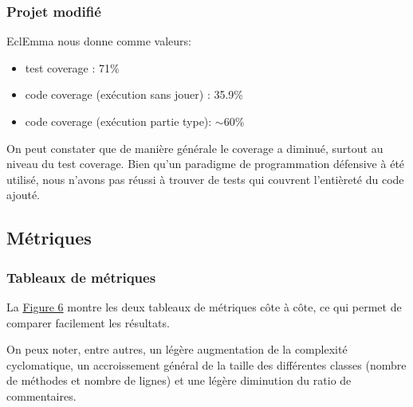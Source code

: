 \documentclass[a4paper,12pt]{report} %
\begin{document}
\subsubsection{Projet modifié}
EclEmma nous donne comme valeurs:
\begin{itemize}
\item test coverage : 71\%
\item code coverage (exécution sans jouer) : 35.9\%
\item code coverage (exécution partie type): $\sim$60\%
\end{itemize}
On peut constater que de manière générale le coverage a diminué, surtout
au niveau du test coverage. Bien qu'un paradigme de programmation
défensive à été utilisé, nous n'avons pas réussi à trouver de tests
qui couvrent l'entièreté du code ajouté.

\subsection{Métriques}
\subsubsection{Tableaux de métriques}
La \hyperref[figure6]{Figure 6} montre les deux tableaux de métriques côte à côte, ce
qui permet de comparer facilement les résultats.

On peux noter, entre autres, un légère augmentation de la complexité
cyclomatique, un accroissement général de la taille des différentes
classes (nombre de méthodes et nombre de lignes) et une légère diminution
du ratio de commentaires.
\end{document}
